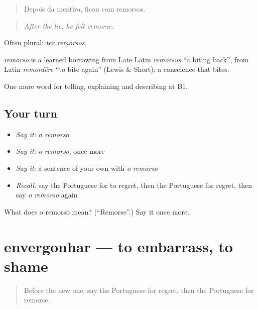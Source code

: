 \begin{quote}
Depois da mentira, ficou com remorsos.
\end{quote}

\begin{quote}
\emph{After the lie, he felt remorse.}
\end{quote}

Often plural: \emph{ter remorsos}.

\begin{cousinweb}
\emph{remorso} is a learned borrowing from Late Latin \emph{remorsus} \textquotedblleft{}a biting back\textquotedblright{}, from Latin \emph{remordēre} \textquotedblleft{}to bite again\textquotedblright{} (Lewis \& Short): a conscience that bites.
\end{cousinweb}

\begin{grammarlens}[title={What you've built}]
One more word for telling, explaining and describing at B1.
\end{grammarlens}

\subsection*{Your turn}
\begin{itemize}
\raggedright
  \item \emph{Say it:} \emph{o remorso}
  \item \emph{Say it:} \emph{o remorso}, once more
  \item \emph{Say it:} a sentence of your own with \emph{o remorso}
  \item \emph{Recall:} say the Portuguese for to regret, then the Portuguese for regret, then say \emph{o remorso} again
\end{itemize}

\begin{tcolorbox}[breakable,colback=teal!4,colframe=teal!35!black,title={Before you move on}]
What does o remorso mean? (\textquotedblleft{}Remorse\textquotedblright{}.) Say it once more.
\end{tcolorbox}
\section[envergonhar]{envergonhar — to embarrass, to shame}

\label{lesson:PT-C480-envergonhar}



\begin{quote}
Before the new one: say the Portuguese for regret, then the Portuguese for remorse.
\end{quote}

